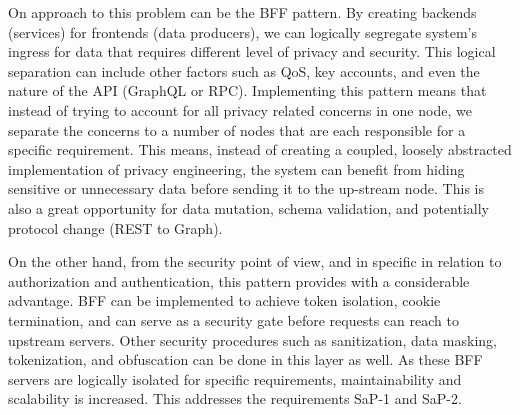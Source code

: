 \documentclass[conference]{IEEEtran}
\begin{document}
On approach to this problem can be the BFF pattern. By creating backends (services) for frontends (data producers), we can logically segregate system's ingress for data that requires different level of privacy and security. This logical separation can include other factors such as QoS, key accounts, and even the nature of the API (GraphQL or RPC). Implementing this pattern means that instead of trying to account for all privacy related concerns in one node, we separate the concerns to a number of nodes that are each responsible for a specific requirement. This means, instead of creating a coupled, loosely abstracted implementation of privacy engineering, the system can benefit from hiding sensitive or unnecessary data before sending it to the up-stream node. This is also a great opportunity for data mutation, schema validation, and potentially protocol change (REST to Graph).

On the other hand, from the security point of view, and in specific in relation to authorization and authentication, this pattern provides with a considerable advantage. BFF can be implemented to achieve token isolation, cookie termination, and can serve as a security gate before requests can reach to upstream servers. Other security procedures such as sanitization, data masking, tokenization, and obfuscation can be done in this layer as well. As these BFF servers are logically isolated for specific requirements, maintainability and scalability is increased. This addresses the requirements SaP-1 and SaP-2. 








\end{document}

